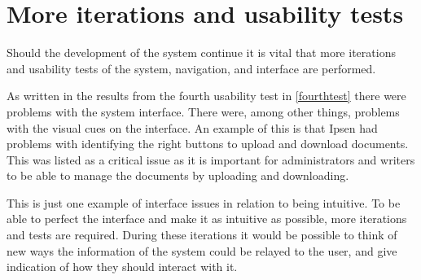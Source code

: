 \documentclass[../../master.tex]{subfiles}
\begin{document}
\section{More iterations and usability tests}

Should the development of the system continue it is vital that more iterations and usability tests of the system, navigation, and interface are performed.

As written in the results from the fourth usability test in \cref{fourthtest} there were problems with the system interface.
There were, among other things, problems with the visual cues on the interface.
An example of this is that Ipsen had problems with identifying the right buttons to upload and download documents.
This was listed as a critical issue as it is important for administrators and writers to be able to manage the documents by uploading and downloading.

This is just one example of interface issues in relation to being intuitive.
To be able to perfect the interface and make it as intuitive as possible, more iterations and tests are required.
During these iterations it would be possible to think of new ways the information of the system could be relayed to the user, and give indication of how they should interact with it.
\end{document}
